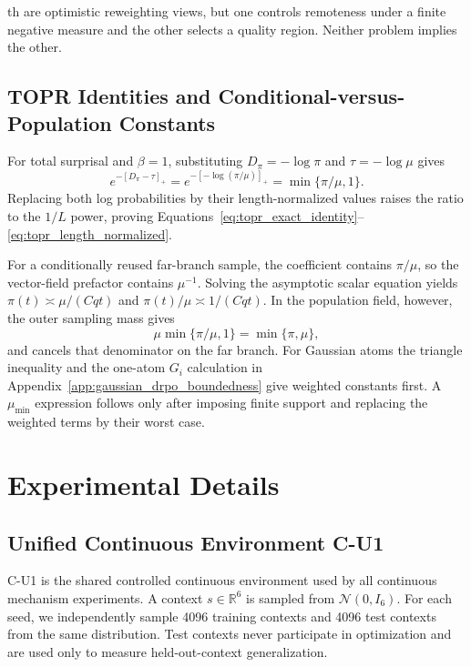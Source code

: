 th are optimistic
reweighting views, but one controls remoteness under a finite negative
measure and the other selects a quality region. Neither problem implies
the other.

\subsection{TOPR Identities and Conditional-versus-Population Constants}
\label{app:topr_relation}

For total surprisal and \(\beta=1\), substituting
\(D_\pi=-\log\pi\) and \(\tau=-\log\mu\) gives
\[
e^{-[D_\pi-\tau]_+}
=e^{-[-\log(\pi/\mu)]_+}
=\min\{\pi/\mu,1\}.
\]
Replacing both log probabilities by their length-normalized values
raises the ratio to the \(1/L\) power, proving
Equations~\eqref{eq:topr_exact_identity}--\eqref{eq:topr_length_normalized}.

For a conditionally reused far-branch sample, the coefficient contains
\(\pi/\mu\), so the vector-field prefactor contains \(\mu^{-1}\).
Solving the asymptotic scalar equation yields
\(\pi(t)\asymp\mu/(Cqt)\) and
\(\pi(t)/\mu\asymp1/(Cqt)\). In the population field, however, the
outer sampling mass gives
\[
\mu\min\{\pi/\mu,1\}=\min\{\pi,\mu\},
\]
and cancels that denominator on the far branch. For Gaussian atoms the
triangle inequality and the one-atom \(G_i\) calculation in
Appendix~\ref{app:gaussian_drpo_boundedness} give weighted constants
first. A \(\mu_{\min}\) expression follows only after imposing finite
support and replacing the weighted terms by their worst case.

\section{Experimental Details}
\label{app:experimental_details}

\subsection{Unified Continuous Environment C-U1}
\label{app:cu1_environment}

C-U1 is the shared controlled continuous environment used by all
continuous mechanism experiments. A context
$s\in\mathbb R^6$
is sampled from
$\mathcal N(0,I_6)$.
For each seed, we independently sample 4096 training contexts and 4096
test contexts from the same distribution. Test contexts never
participate in optimization and are used only to measure
held-out-context generalization.

